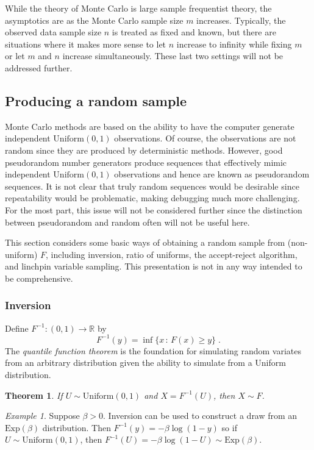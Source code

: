 \documentclass[12pt]{article}
\theoremstyle{plain}
\newtheorem{thm}{Theorem}[section]
\theoremstyle{definition}
\theoremstyle{remark}
\newtheorem{example}{Example}[section]
\begin{document}
While the theory of Monte Carlo is large sample frequentist theory,
the asymptotics are as the Monte Carlo sample size $m$ increases.
Typically, the observed data sample size $n$ is treated as fixed and
known, but there are situations where it makes more sense to let $n$
increase to infinity while fixing $m$ or let $m$ and $n$ increase
simultaneously. These last two settings will not be addressed further.

\subsection{Producing a random sample}
\label{gofmc:sec:Producing}

Monte Carlo methods are based on the ability to have the computer
generate independent $\text{Uniform}(0,1)$ observations.  Of course,
the observations are not random since they are produced by
deterministic methods.  However, good pseudorandom number generators
produce sequences that effectively mimic independent
$\text{Uniform}(0,1)$ observations and hence are known as pseudorandom
sequences.  It is not clear that truly random sequences would be
desirable since repeatability would be problematic, making debugging
much more challenging.  For the most part, this issue will not be
considered further since the distinction between pseudorandom and
random often will not be useful here.

This section considers some basic ways of obtaining a random sample
from (non-uniform) $F$, including inversion, ratio of uniforms, the
accept-reject algorithm, and linchpin variable sampling.  This
presentation is not in any way intended to be comprehensive.

\subsubsection{Inversion} 
Define $F^{-1} : (0,1) \to \mathbb{R}$ by
$$
F^{-1}(y) = \inf \{ x\, : \, F(x) \ge y\} \; .
$$
The \textit{quantile function theorem} is the foundation for
simulating random variates from an arbitrary distribution given the
ability to simulate from a Uniform distribution.

\begin{thm}\label{thm:quantile function}
If $U \sim \text{Uniform}(0,1)$ and $X = F^{-1}(U)$, then $X \sim F$.
\end{thm}

\begin{example}
  Suppose $\beta > 0$.  Inversion can be used to construct a draw from
  an $\text{Exp}(\beta)$ distribution.  Then $F^{-1}(y) = -\beta
  \log(1-y)$ so if $U \sim \text{Uniform}(0,1)$, then $F^{-1}(U) =
  -\beta \log(1-U) \sim \text{Exp}(\beta)$.
\end{example}
\end{document}
